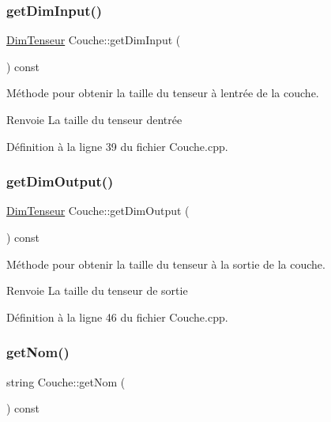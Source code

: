 \subsubsection{\texorpdfstring{get\+Dim\+Input()}{getDimInput()}}
{\footnotesize\ttfamily \hyperlink{class_dim_tenseur}{Dim\+Tenseur} Couche\+::get\+Dim\+Input (\begin{DoxyParamCaption}{ }\end{DoxyParamCaption}) const}



Méthode pour obtenir la taille du tenseur à l\textquotesingle{}entrée de la couche. 

\begin{DoxyReturn}{Renvoie}
La taille du tenseur d\textquotesingle{}entrée 
\end{DoxyReturn}


Définition à la ligne 39 du fichier Couche.\+cpp.

\mbox{\label{class_couche_ae8c80adf3a53da0d975e6f1148d0cea9}} 
\subsubsection{\texorpdfstring{get\+Dim\+Output()}{getDimOutput()}}
{\footnotesize\ttfamily \hyperlink{class_dim_tenseur}{Dim\+Tenseur} Couche\+::get\+Dim\+Output (\begin{DoxyParamCaption}{ }\end{DoxyParamCaption}) const}



Méthode pour obtenir la taille du tenseur à la sortie de la couche. 

\begin{DoxyReturn}{Renvoie}
La taille du tenseur de sortie 
\end{DoxyReturn}


Définition à la ligne 46 du fichier Couche.\+cpp.

\mbox{\label{class_couche_a367bb58eaafab2b5fe635e6d3350fe4b}} 
\subsubsection{\texorpdfstring{get\+Nom()}{getNom()}}
{\footnotesize\ttfamily string Couche\+::get\+Nom (\begin{DoxyParamCaption}{ }\end{DoxyParamCaption}) const}



